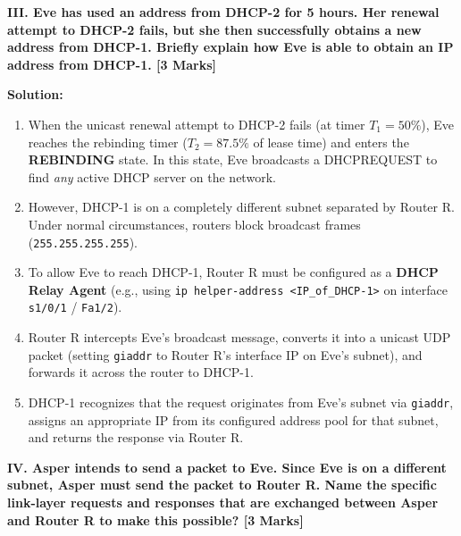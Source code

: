 \documentclass[11pt,a4paper]{article}
\begin{document}
\vspace{0.2cm}
\textbf{III. Eve has used an address from DHCP-2 for 5 hours. Her renewal attempt to DHCP-2 fails, but she then successfully obtains a new address from DHCP-1. Briefly explain how Eve is able to obtain an IP address from DHCP-1. [3 Marks]}

\textbf{Solution:}
\begin{enumerate}
    \item When the unicast renewal attempt to DHCP-2 fails (at timer $T_1 = 50\%$), Eve reaches the rebinding timer ($T_2 = 87.5\%$ of lease time) and enters the \textbf{REBINDING} state. In this state, Eve broadcasts a DHCPREQUEST to find \emph{any} active DHCP server on the network.
    \item However, DHCP-1 is on a completely different subnet separated by Router R. Under normal circumstances, routers block broadcast frames (\texttt{255.255.255.255}).
    \item To allow Eve to reach DHCP-1, Router R must be configured as a \textbf{DHCP Relay Agent} (e.g., using \texttt{ip helper-address <IP\_of\_DHCP-1>} on interface \texttt{s1/0/1} / \texttt{Fa1/2}).
    \item Router R intercepts Eve's broadcast message, converts it into a unicast UDP packet (setting \texttt{giaddr} to Router R's interface IP on Eve's subnet), and forwards it across the router to DHCP-1.
    \item DHCP-1 recognizes that the request originates from Eve's subnet via \texttt{giaddr}, assigns an appropriate IP from its configured address pool for that subnet, and returns the response via Router R.
\end{enumerate}

\vspace{0.2cm}
\textbf{IV. Asper intends to send a packet to Eve. Since Eve is on a different subnet, Asper must send the packet to Router R. Name the specific link-layer requests and responses that are exchanged between Asper and Router R to make this possible? [3 Marks]}
\end{document}
